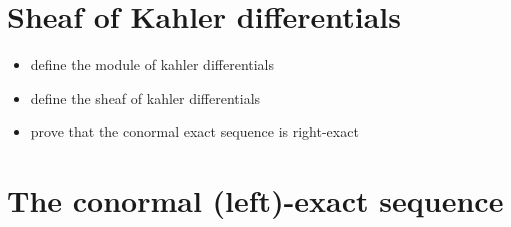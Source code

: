 \documentclass[a4paper]{article}
\newtheorem{prop}[thm]{Proposition}
\newcommand{\Spec}{\operatorname{Spec}}
\begin{document}
%
%			
%
%

\section{Sheaf of Kahler differentials}

\begin{itemize}
	\item define the module of kahler differentials
	\item define the sheaf of kahler differentials
	\item prove that the conormal exact sequence is right-exact
\end{itemize}

\section{The conormal (left)-exact sequence}
\end{document}
